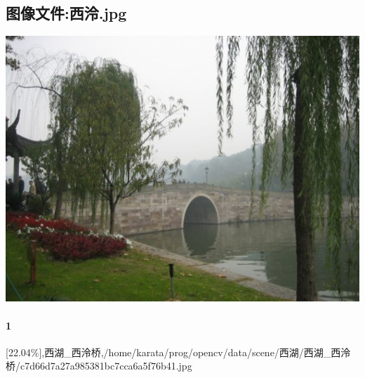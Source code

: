\subsection{图像文件:西泠.jpg}
\includegraphics[width=15cm,angle=0]{西泠.jpg}

\paragraph{1}
[22.04\%],西湖_西泠桥,/home/karata/prog/opencv/data/scene/西湖/西湖_西泠桥/c7d66d7a27a985381bc7cca6a5f76b41.jpg

